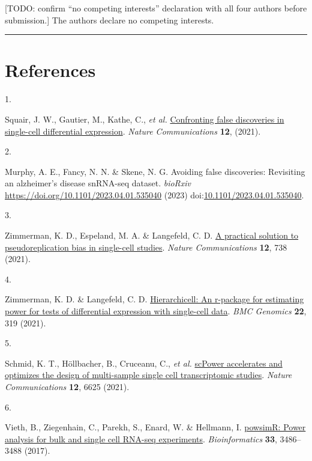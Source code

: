 \documentclass[
]{article}
\newlength{\cslhangindent}
\newlength{\csllabelwidth}
\newenvironment{CSLReferences}[2] %
 {\begin{list}{}{%
  \setlength{\itemindent}{0pt}
  \setlength{\leftmargin}{0pt}
  \setlength{\parsep}{0pt}
  \ifodd #1
   \setlength{\leftmargin}{\cslhangindent}
   \setlength{\itemindent}{-1\cslhangindent}
  \fi
  \setlength{\itemsep}{#2\baselineskip}}}
 {\end{list}}
\newcommand{\CSLLeftMargin}[1]{\parbox[t]{\csllabelwidth}{\strut#1\strut}}
\newcommand{\CSLRightInline}[1]{\parbox[t]{\linewidth - \csllabelwidth}{\strut#1\strut}}
\begin{document}
{[}TODO: confirm ``no competing interests'' declaration with all four
authors before submission.{]} The authors declare no competing
interests.

\begin{center}\rule{0.5\linewidth}{0.5pt}\end{center}

\section{References}\label{references}

\label{refs}
\begin{CSLReferences}{0}{0}
\CSLLeftMargin{1. }%
\CSLRightInline{Squair, J. W., Gautier, M., Kathe, C., \emph{et al.}
\href{https://doi.org/10.1038/s41467-021-25960-2}{Confronting false
discoveries in single-cell differential expression}. \emph{Nature
Communications} \textbf{12}, (2021).}

\CSLLeftMargin{2. }%
\CSLRightInline{Murphy, A. E., Fancy, N. N. \& Skene, N. G. Avoiding
false discoveries: Revisiting an alzheimer's disease snRNA-seq dataset.
\emph{bioRxiv} \url{https://doi.org/10.1101/2023.04.01.535040} (2023)
doi:\href{https://doi.org/10.1101/2023.04.01.535040}{10.1101/2023.04.01.535040}.}

\CSLLeftMargin{3. }%
\CSLRightInline{Zimmerman, K. D., Espeland, M. A. \& Langefeld, C. D.
\href{https://doi.org/10.1038/s41467-021-21038-1}{A practical solution
to pseudoreplication bias in single-cell studies}. \emph{Nature
Communications} \textbf{12}, 738 (2021).}

\CSLLeftMargin{4. }%
\CSLRightInline{Zimmerman, K. D. \& Langefeld, C. D.
\href{https://doi.org/10.1186/s12864-021-07635-w}{Hierarchicell: An
r-package for estimating power for tests of differential expression with
single-cell data}. \emph{BMC Genomics} \textbf{22}, 319 (2021).}

\CSLLeftMargin{5. }%
\CSLRightInline{Schmid, K. T., Höllbacher, B., Cruceanu, C., \emph{et
al.} \href{https://doi.org/10.1038/s41467-021-26779-7}{scPower
accelerates and optimizes the design of multi-sample single cell
transcriptomic studies}. \emph{Nature Communications} \textbf{12}, 6625
(2021).}

\CSLLeftMargin{6. }%
\CSLRightInline{Vieth, B., Ziegenhain, C., Parekh, S., Enard, W. \&
Hellmann, I.
\href{https://doi.org/10.1093/bioinformatics/btx435}{powsimR: Power
analysis for bulk and single cell RNA-seq experiments}.
\emph{Bioinformatics} \textbf{33}, 3486--3488 (2017).}


\end{CSLReferences}
\end{document}
